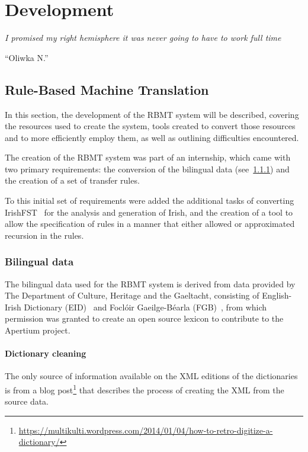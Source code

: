 
\chapter{Development}
\label{chap:devel}
\epigraph{\textit{\small{I promised my right hemisphere it was never going to have to work full time}}}{``Oliwka N.''}

\section{Rule-Based Machine Translation}
\label{sect:ch3rbmt}

In this section, the development of the RBMT system will be described, covering the resources used to create the system, 
tools created to convert those resources and to more efficiently employ them, as well as outlining difficulties encountered.

The creation of the RBMT system was part of an internship, which came with two primary
requirements: the conversion of the bilingual data (see~\ref{ssect:devrbmtbil}) and the
creation of a set of transfer rules.

To this initial set of requirements were added the additional tasks of converting 
IrishFST~\citep{elain09} for the analysis and generation of Irish, and the creation
of a tool to allow the specification of rules in a manner that either allowed or
approximated recursion in the rules.

\subsection{Bilingual data}
\label{ssect:devrbmtbil}

The bilingual data used for the RBMT system is derived from data provided
by The Department of Culture, Heritage and the Gaeltacht, consisting of
English-Irish Dictionary (EID)~\citep{debhaldraithe1959english} and Focl{\'o}ir 
Gaeilge-B{\'e}arla (FGB)~\citep{donaill1977focloir}, from which permission was
granted to create an open source lexicon to contribute to the Apertium
project.

\subsubsection{Dictionary cleaning}

The only source of information available on the XML editions of the dictionaries
is from a blog post\footnote{\href{https://multikulti.wordpress.com/2014/01/04/how-to-retro-digitize-a-dictionary/}{https://multikulti.wordpress.com/2014/01/04/how-to-retro-digitize-a-dictionary/}} 
that describes the process of creating the XML from the source data.

